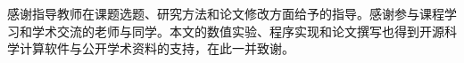 \documentclass{csustThesis}
\begin{document}
\hypersetup{pageanchor=false}

\hypersetup{pageanchor=true}

\makecontents









\setcounter{secnumdepth}{0}
\printbibliography[heading=none]

感谢指导教师在课题选题、研究方法和论文修改方面给予的指导。感谢参与课程学习和学术交流的老师与同学。本文的数值实验、程序实现和论文撰写也得到开源科学计算软件与公开学术资料的支持，在此一并致谢。


\end{document}
